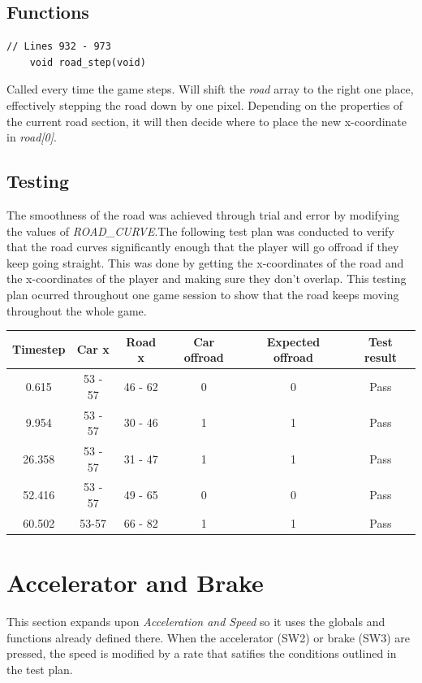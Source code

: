 \documentclass{article}
\begin{document}
\subsection*{Functions}
\begin{lstlisting}[style=CStyle]
	// Lines 932 - 973
	void road_step(void)
\end{lstlisting}
Called every time the game steps. Will shift the \emph{road} array to the right one place, effectively stepping the road down by one pixel. Depending on the properties of the current road section, it will then decide where to place the new x-coordinate in \emph{road[0]}.
\newline

\subsection*{Testing}
The smoothness of the road was achieved through trial and error by modifying the values of \emph{ROAD\_CURVE}.The following test plan was conducted to verify that the road curves significantly enough that the player will go offroad if they keep going straight. This was done by getting the x-coordinates of the road and the x-coordinates of the player and making sure they don't overlap.
\newline
This testing plan ocurred throughout one game session to show that the road keeps moving throughout the whole game.
\begin{center}
\begin{tabular}{ c c c c c c }
Timestep	& Car x 	& Road x 	& Car offroad	& Expected offroad		& Test result		\\ \hline
0.615		& 53 - 57	& 46 - 62	& 0			& 0				& Pass		\\
9.954		& 53 - 57	& 30 - 46	& 1			& 1				& Pass		\\
26.358	& 53 - 57	& 31 - 47	& 1			& 1				& Pass		\\
52.416	& 53 - 57	& 49 - 65	& 0			& 0 				& Pass		\\
60.502	& 53-57	& 66 - 82	& 1			& 1				& Pass		\\ \hline
\end{tabular}
\end{center}


\clearpage

\section{Accelerator and Brake}
This section expands upon \emph{Acceleration and Speed} so it uses the globals and functions already defined there. When the accelerator (SW2) or brake (SW3) are pressed, the speed is modified by a rate that satifies the conditions outlined in the test plan.
 
\end{document}
